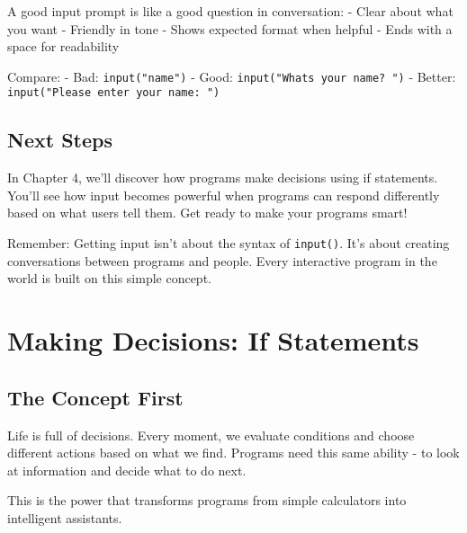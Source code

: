 \documentclass[
  letterpaper,
  DIV=11,
  numbers=noendperiod,
  oneside]{scrreprt}
\begin{document}
\begin{tcolorbox}[enhanced jigsaw, opacityback=0, colback=white, colframe=quarto-callout-tip-color-frame, breakable, titlerule=0mm, coltitle=black, rightrule=.15mm, colbacktitle=quarto-callout-tip-color!10!white, left=2mm, bottomtitle=1mm, bottomrule=.15mm, title=\textcolor{quarto-callout-tip-color}{\faLightbulb}\hspace{0.5em}{The Art of Good Prompts}, opacitybacktitle=0.6, toptitle=1mm, leftrule=.75mm, arc=.35mm, toprule=.15mm]

A good input prompt is like a good question in conversation: - Clear
about what you want - Friendly in tone - Shows expected format when
helpful - Ends with a space for readability

Compare: - Bad: \texttt{input("name")} - Good:
\texttt{input("What\textquotesingle{}s\ your\ name?\ ")} - Better:
\texttt{input("Please\ enter\ your\ name:\ ")}

\end{tcolorbox}

\section{Next Steps}\label{next-steps-3}

In Chapter 4, we'll discover how programs make decisions using if
statements. You'll see how input becomes powerful when programs can
respond differently based on what users tell them. Get ready to make
your programs smart!

Remember: Getting input isn't about the syntax of \texttt{input()}. It's
about creating conversations between programs and people. Every
interactive program in the world is built on this simple concept.

\chapter{Making Decisions: If Statements}\label{sec-making-decisions}

\section{The Concept First}\label{the-concept-first-3}

Life is full of decisions. Every moment, we evaluate conditions and
choose different actions based on what we find. Programs need this same
ability - to look at information and decide what to do next.

This is the power that transforms programs from simple calculators into
intelligent assistants.
\end{document}
